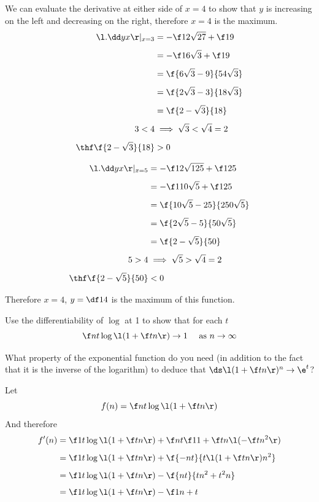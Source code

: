 \documentclass[a4paper]{article}
\begin{document}
We can evaluate the derivative at either side of $x=4$ to show that $y$ is increasing on the left and decreasing on the right, therefore $x=4$ is the maximum.
\begin{align*}
\l. \dd yx \r|_{x=3} &= -\f1{2 \sqrt{27}} + \f19\\[1ex]
&= -\f1{6 \sqrt3} + \f19\\[1ex]
&= \f{6 \sqrt3 - 9}{54 \sqrt3}\\[1ex]
&= \f{2 \sqrt3 - 3}{18 \sqrt3}\\[1ex]
&= \f{2 - \sqrt 3}{18}\\[1ex]
3 < 4 &\implies \sqrt 3 < \sqrt 4 = 2\\[1ex]
\thf \f{2 - \sqrt 3}{18} &> 0
\end{align*}

\begin{align*}
\l. \dd yx \r|_{x=5} &= -\f1{2 \sqrt{125}} + \f1{25}\\[1ex]
&= -\f1{10 \sqrt5} + \f1{25}\\[1ex]
&= \f{10 \sqrt5 - 25}{250 \sqrt 5}\\[1ex]
&= \f{2 \sqrt5 - 5}{50 \sqrt 5}\\[1ex]
&= \f{2 - \sqrt5}{50}\\[1ex]
5 > 4 &\implies \sqrt 5 > \sqrt 4 = 2\\[1ex]
\thf \f{2 - \sqrt5}{50} &< 0
\end{align*}

Therefore $x = 4$, $y = \df14$ is the maximum of this function.



\begin{questionbody}
Use the differentiability of $\log$ at 1 to show that for each $t$ \[
\f nt \log\l( 1 + \f tn \r) \to 1 \quad\text{ as } n \to \infty
\]

What property of the exponential function do you need (in addition to the fact that it is the inverse of the logarithm) to deduce that $\ds \l( 1 + \f tn \r)^n \to \e^t$?
\end{questionbody}

Let $$f(n) = \f nt \log\l( 1 + \f tn \r)$$
And therefore \begin{align*}
f'(n) &= \f1t \log\l( 1 + \f tn \r) + \f nt \f1{1 + \f tn} \l(-\f t{n^2}\r)\\[1ex]
&= \f1t \log\l( 1 + \f tn \r) + \f{-nt}{t \l( 1 + \f tn \r) n^2}\\[1ex]
&= \f1t \log\l( 1 + \f tn \r) - \f{nt}{tn^2 + t^2n}\\[1ex]
&= \f1t \log\l( 1 + \f tn \r) - \f1{n + t}
\end{align*}
\end{document}

